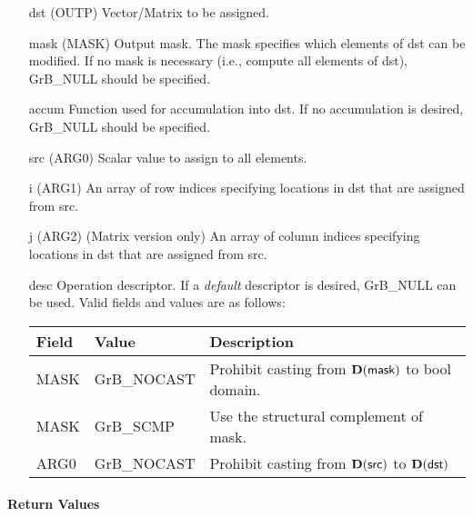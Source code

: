 \begin{itemize}[leftmargin=1.1in]
    \item[{\sf dst}]   ({\sf OUTP}) Vector/Matrix to be assigned.

    \item[{\sf mask}] ({\sf MASK}) Output mask. The mask specifies which elements
    of {\sf dst} can be modified. If no mask is necessary (i.e., compute all
    elements of {\sf dst}), {\sf GrB\_NULL} should be specified.

    \item[{\sf accum}] Function used for accumulation into {\sf dst}.  If no accumulation
                        is desired, {\sf GrB\_NULL} should be specified.

    \item[{\sf src}]   ({\sf ARG0}) Scalar value to assign to all elements.
    \item[{\sf i}]     ({\sf ARG1}) An array of row indices specifying locations in dst that
                       are assigned from src.
    \item[{\sf j}]     ({\sf ARG2}) (Matrix version only) An array of column indices 
                       specifying locations in dst that are assigned from src.


    \item[{\sf desc}]   Operation descriptor. If a
    \emph{default} descriptor is desired, {\sf GrB\_NULL} can be
    used. Valid fields and values are as follows: \\
    \begin{tabular}{lll}
    Field  & Value & Description \\
    \hline
    {\sf MASK} & {\sf GrB\_NOCAST} & Prohibit casting from $\bold{D}({\sf mask})$ to {\sf bool} domain. \\
    {\sf MASK} & {\sf GrB\_SCMP} & Use the structural complement of {\sf mask}. \\
    {\sf ARG0} & {\sf GrB\_NOCAST} & Prohibit casting from $\bold{D}({\sf src})$ to $\bold{D}({\sf dst})$ \\
    \end{tabular}

\end{itemize}

\paragraph{Return Values}

